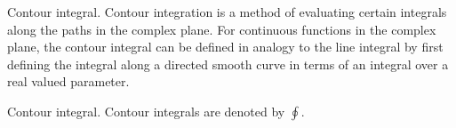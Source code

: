 \documentclass[11pt,reqno,oneside,a4paper]{article}
\begin{document}
\begin{defn}{Contour integral.}
Contour integration is a method of evaluating certain integrals along the paths in the complex plane. 
For continuous functions in the complex plane, the contour integral can be defined in analogy to the line integral by first defining the integral along a directed smooth curve in terms of an integral over a real valued parameter.
\end{defn}

\begin{ntn}{Contour integral.}
Contour integrals are denoted by $\oint$.
\end{ntn}
\end{document}
